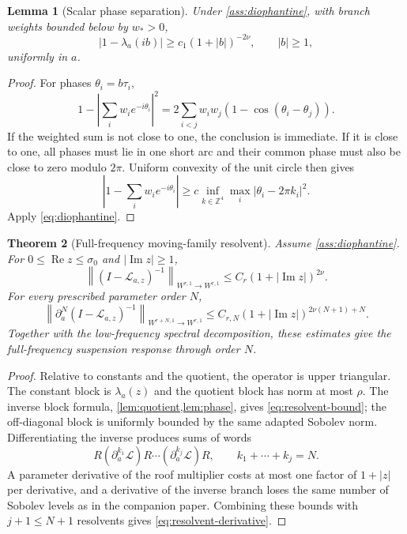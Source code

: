 \documentclass[11pt,reqno]{amsart}
\newtheorem{theorem}{Theorem}[section]
\newtheorem{lemma}[theorem]{Lemma}
\theoremstyle{definition}
\theoremstyle{remark}
\newcommand{\norm}[1]{\left\lVert #1\right\rVert}
\newcommand{\abs}[1]{\left\lvert #1\right\rvert}
\begin{document}
\begin{lemma}[Scalar phase separation]\label{lem:phase}
Under \cref{ass:diophantine}, with branch weights bounded below by $w_*>0$,
\begin{equation}\label{eq:phase-gap}
 \abs{1-\lambda_a(ib)}
 \ge c_1(1+\abs b)^{-2\nu},
 \qquad \abs b\ge1,
\end{equation}
uniformly in $a$.
\end{lemma}

\begin{proof}
For phases $\theta_i=b\tau_i$,
\[
 1-\abs{\textstyle\sum_iw_ie^{-i\theta_i}}^2
 =2\sum_{i<j}w_iw_j(1-\cos(\theta_i-\theta_j)).
\]
If the weighted sum is not close to one, the conclusion is immediate.  If it
is close to one, all phases must lie in one short arc and their common phase
must also be close to zero modulo $2\pi$.  Uniform convexity of the unit circle
then gives
\[
 \abs{1-\textstyle\sum_iw_ie^{-i\theta_i}}
 \ge c\inf_{k\in\mathbb Z^4}
       \max_i\abs{\theta_i-2\pi k_i}^2.
\]
Apply \eqref{eq:diophantine}.
\end{proof}

\begin{theorem}[Full-frequency moving-family resolvent]\label{thm:full-frequency}
Assume \cref{ass:diophantine}.  For
$0\le\operatorname{Re}z\le\sigma_0$ and $\abs{\operatorname{Im}z}\ge1$,
\begin{equation}\label{eq:resolvent-bound}
 \norm{(I-\mathcal L_{a,z})^{-1}}_{W^{r,1}\to W^{r,1}}
 \le C_r(1+\abs{\operatorname{Im}z})^{2\nu}.
\end{equation}
For every prescribed parameter order $N$,
\begin{equation}\label{eq:resolvent-derivative}
 \norm{\partial_a^N(I-\mathcal L_{a,z})^{-1}}
 _{W^{r+N,1}\to W^{r,1}}
 \le C_{r,N}(1+\abs{\operatorname{Im}z})^{2\nu(N+1)+N}.
\end{equation}
Together with the low-frequency spectral decomposition, these estimates give
the full-frequency suspension response through order $N$.
\end{theorem}

\begin{proof}
Relative to constants and the quotient, the operator is upper triangular.  The
constant block is $\lambda_a(z)$ and the quotient block has norm at most
$\rho$.  The inverse block formula, \cref{lem:quotient,lem:phase}, gives
\eqref{eq:resolvent-bound}; the off-diagonal block is uniformly bounded by the
same adapted Sobolev norm.  Differentiating the inverse produces sums of words
\[
 R(\partial_a^{k_1}\mathcal L)R\cdots
 (\partial_a^{k_j}\mathcal L)R,
 \qquad k_1+\cdots+k_j=N.
\]
A parameter derivative of the roof multiplier costs at most one factor of
$1+\abs z$ per derivative, and a derivative of the inverse branch loses the
same number of Sobolev levels as in the companion paper.  Combining these
bounds with $j+1\le N+1$ resolvents gives
\eqref{eq:resolvent-derivative}.
\end{proof}
\end{document}
